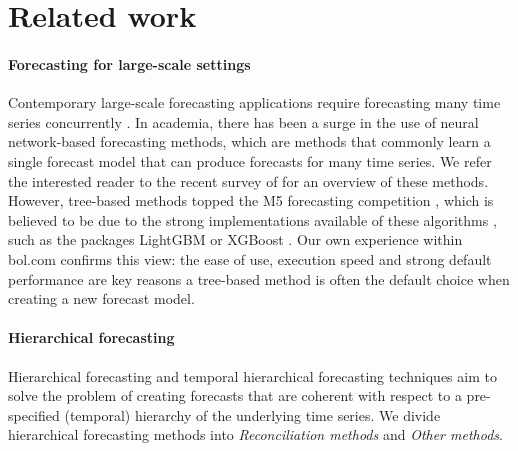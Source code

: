 \documentclass[preprint, 3p, times, twocolumn]{elsarticle}
\begin{document}
\section{Related work} \label{sec:relwork}

\paragraph{Forecasting for large-scale settings} Contemporary large-scale forecasting applications require forecasting many time series concurrently \cite{bose_probabilistic_2017}. In academia, there has been a surge in the use of neural network-based forecasting methods, which are methods that commonly learn a single forecast model that can produce forecasts for many time series. We refer the interested reader to the recent survey of \citet{benidis_deep_2023} for an overview of these methods. However, tree-based methods topped the M5 forecasting competition \cite{makridakis_m5_2022}, which is believed to be due to the strong implementations available of these algorithms \cite{januschowski_forecasting_2022}, such as the packages LightGBM \cite{ke_lightgbm_2017} or XGBoost \cite{chen_xgboost_2016}. Our own experience within bol.com confirms this view: the ease of use, execution speed and strong default performance are key reasons a tree-based method is often the default choice when creating a new forecast model.

\paragraph{Hierarchical forecasting} Hierarchical forecasting \cite{hyndman_optimal_2011, hyndman_fast_2016, taieb_coherent_2017, bentaieb_regularized_2019, wickramasuriya_optimal_2019} and temporal hierarchical forecasting techniques \cite{taieb_sparse_2017,athanasopoulos_forecasting_2017,rangapuram_coherent_2023,theodosiou_forecasting_2021} aim to solve the problem of creating forecasts that are coherent with respect to a pre-specified (temporal) hierarchy of the underlying time series. We divide hierarchical forecasting methods into \textit{Reconciliation methods} and \textit{Other methods}.
\end{document}
